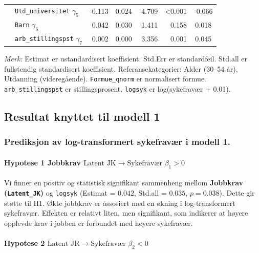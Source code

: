 \documentclass[
  12pt,
  a4paper,
  DIV=11,
  numbers=noendperiod]{scrartcl}
\let\oldparagraph\paragraph
\renewcommand{\paragraph}[1]{\oldparagraph{#1}\mbox{}}
\begin{document}
\begin{table}[htbp]
\begin{tabular}{@{}llrrrrc@{}}
& \texttt{Utd\_universitet} $\gamma_5$ & -0.113 & 0.024 & -4.709 & <0.001 & -0.066 \\
& \texttt{Barn} $\gamma_6$ & 0.042 & 0.030 & 1.411 & 0.158 & 0.018 \\
& \texttt{arb\_stillingspst} $\gamma_7$ & 0.002 & 0.000 & 3.356 & 0.001 & 0.045 \\
\bottomrule
\end{tabular}
\raggedright
\footnotesize{\textit{Merk:} Estimat er ustandardisert koeffisient. Std.Err er standardfeil. Std.all er fullstendig standardisert koeffisient. Referansekategorier: Alder (30–54 år), Utdanning (videregående). \texttt{Formue\_qnorm} er normalisert formue. \texttt{arb\_stillingspst} er stillingsprosent. \texttt{logsyk} er log(sykefravær + 0.01).}
\end{table}

\subsection{Resultat knyttet til modell
1}\label{resultat-knyttet-til-modell-1}

\subsubsection{Prediksjon av log-transformert sykefravær i modell
1.}\label{prediksjon-av-log-transformert-sykefravuxe6r-i-modell-1.}

\paragraph{\texorpdfstring{Hypotese 1 Jobbkrav
\(\text{Latent JK} \rightarrow \text{Sykefravær } \beta_1 > 0\)}{Hypotese 1 Jobbkrav \textbackslash text\{Latent JK\} \textbackslash rightarrow \textbackslash text\{Sykefravær \} \textbackslash beta\_1 \textgreater{} 0}}\label{hypotese-1-jobbkrav-textlatent-jk-rightarrow-textsykefravuxe6r-beta_1-0}

Vi finner en positiv og statistisk signifikant sammenheng mellom
\textbf{Jobbkrav (\texttt{Latent\_JK})} og \texttt{logsyk} (Estimat =
\(0.042\), Std.all = \(0.035\), \(p = 0.038\)). Dette gir støtte til H1.
Økte jobbkrav er assosiert med en økning i log-transformert sykefravær.
Effekten er relativt liten, men signifikant, som indikerer at høyere
opplevde krav i jobben er forbundet med høyere sykefravær.

\paragraph{\texorpdfstring{Hypotese 2
\(\text{Latent JR} \rightarrow \text{Sykefravær } \beta_2 < 0\)}{Hypotese 2 \textbackslash text\{Latent JR\} \textbackslash rightarrow \textbackslash text\{Sykefravær \} \textbackslash beta\_2 \textless{} 0}}\label{hypotese-2-textlatent-jr-rightarrow-textsykefravuxe6r-beta_2-0}
\end{document}
